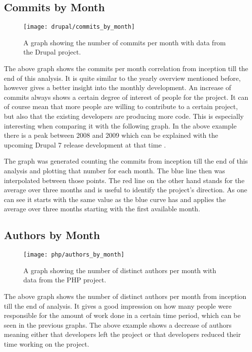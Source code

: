 
\subsection{Commits by Month} %

\begin{figure}[h!t]
  \centering
  \texttt{[image: drupal/commits\_by\_month]}
  \caption{A graph showing the number of commits per month with data from the
  Drupal project.}
\end{figure}

The above graph shows the commits per month correlation from inception till the
end of this analysis. It is quite similar to the yearly overview mentioned
before, however gives a better insight into the monthly development. An
increase of commits always shows a certain degree of interest of people for the
project. It can of course mean that more people are willing to contribute to a
certain project, but also that the existing developers are producing more code.
This is especially interesting when comparing it with the following graph. In
the above example there is a peak between 2008 and 2009 which can be explained
with the upcoming Drupal 7 release development at that time .

The graph was generated counting the commits from inception till the end of
this analysis and plotting that number for each month. The blue line then was
interpolated between those points. The red line on the other hand stands for
the average over three months and is useful to identify the project's
direction. As one can see it starts with the same value as the blue curve has
and applies the average over three months starting with the first available
month.


\subsection{Authors by Month} %

\begin{figure}[h!t]
  \centering
  \texttt{[image: php/authors\_by\_month]}
  \caption{A graph showing the number of distinct authors per month with data
  from the PHP project.}
\end{figure}

The above graph shows the number of distinct authors per month from inception
till the end of analysis. It gives a good impression on how many people were
responsible for the amount of work done in a certain time period, which can be
seen in the previous graphs. The above example shows a decrease of authors
meaning either that developers left the project or that developers reduced
their time working on the project.

